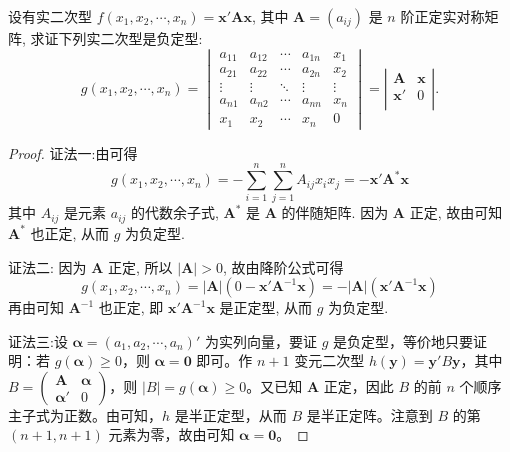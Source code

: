 \documentclass[../../main.tex]{subfiles}%
\begin{document}
\begin{proposition}\label{proposition:利用正定阵构造负定二次型}
设有实二次型 \(f(x_1,x_2,\cdots,x_n)=\boldsymbol{x}'\boldsymbol{A}\boldsymbol{x}\), 其中 \(\boldsymbol{A}=(a_{ij})\) 是 \(n\) 阶正定实对称矩阵, 求证下列实二次型是负定型:
\[g(x_1,x_2,\cdots,x_n)=\begin{vmatrix}
a_{11}&a_{12}&\cdots&a_{1n}&x_1\\
a_{21}&a_{22}&\cdots&a_{2n}&x_2\\
\vdots&\vdots&\ddots&\vdots&\vdots\\
a_{n1}&a_{n2}&\cdots&a_{nn}&x_n\\
x_1&x_2&\cdots&x_n&0
\end{vmatrix}=\left| \begin{matrix}
	\boldsymbol{A}&		\boldsymbol{x}\\
	\boldsymbol{x}'&		0\\
\end{matrix} \right|.
\]
\end{proposition}
\begin{proof}

{\color{blue}证法一:}由可得
\[g(x_1,x_2,\cdots,x_n)=-\sum_{i = 1}^{n}\sum_{j = 1}^{n}A_{ij}x_ix_j=-\boldsymbol{x}'\boldsymbol{A}^*\boldsymbol{x}\]
其中 \(A_{ij}\) 是元素 \(a_{ij}\) 的代数余子式, \(\boldsymbol{A}^*\) 是 \(\boldsymbol{A}\) 的伴随矩阵. 因为 \(\boldsymbol{A}\) 正定, 故由可知 \(\boldsymbol{A}^*\) 也正定, 从而 \(g\) 为负定型.

{\color{blue}证法二:} 因为 \(\boldsymbol{A}\) 正定, 所以 \(|\boldsymbol{A}|>0\), 故由降阶公式可得
\[g(x_1,x_2,\cdots,x_n)=|\boldsymbol{A}|(0 - \boldsymbol{x}'\boldsymbol{A}^{-1}\boldsymbol{x})=-|\boldsymbol{A}|(\boldsymbol{x}'\boldsymbol{A}^{-1}\boldsymbol{x})\]
再由可知 \(\boldsymbol{A}^{-1}\) 也正定, 即 \(\boldsymbol{x}'\boldsymbol{A}^{-1}\boldsymbol{x}\) 是正定型, 从而 \(g\) 为负定型.

{\color{blue}证法三:}设 $\boldsymbol{\alpha}=(a_1,a_2,\cdots,a_n)'$ 为实列向量，要证 $g$ 是负定型，等价地只要证明：若 $g(\boldsymbol{\alpha})\geqslant 0$，则 $\boldsymbol{\alpha}=\boldsymbol{0}$ 即可。作 $n + 1$ 变元二次型 $h(\boldsymbol{y})=\boldsymbol{y}'B\boldsymbol{y}$，其中 $B = \begin{pmatrix}
\boldsymbol{A} & \boldsymbol{\alpha} \\
\boldsymbol{\alpha}' & 0
\end{pmatrix}$，则 $|B| = g(\boldsymbol{\alpha})\geqslant 0$。又已知 $\boldsymbol{A}$ 正定，因此 $B$ 的前 $n$ 个顺序主子式为正数。由可知，$h$ 是半正定型，从而 $B$ 是半正定阵。注意到 $B$ 的第 $(n + 1,n + 1)$ 元素为零，故由可知 $\boldsymbol{\alpha}=\boldsymbol{0}$。
\end{proof}
\end{document}
